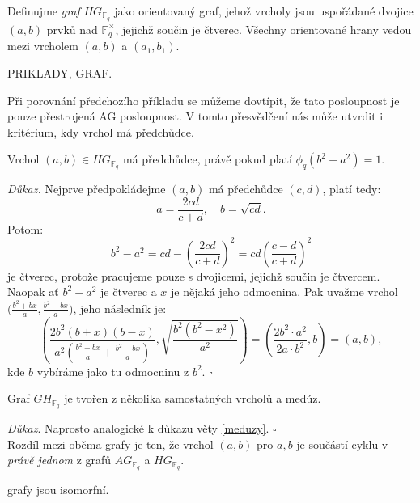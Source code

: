 \documentclass[12pt]{report}
\begin{document}
\begin{definice}
Definujme \textit{graf} $HG_{\mathbb{F}_q}$ jako orientovaný graf, jehož vrcholy jsou uspořádané dvojice $(a,b)$ prvků nad $\mathbb{F}_q ^{\times}$, jejichž součin je čtverec. Všechny orientované hrany vedou mezi vrcholem $(a,b)$ a $(a_1,b_1)$.
\end{definice}
PRIKLADY, GRAF.

Při porovnání předchozího příkladu se můžeme dovtípit, že tato posloupnost je pouze přestrojená AG posloupnost. V tomto přesvědčení nás může utvrdit i kritérium, kdy vrchol má předchůdce.


\begin{lemma}
Vrchol $(a,b) \in HG_{\mathbb{F}_q}$ má předchůdce, právě pokud platí $\phi_q(b^2-a^2)=1$.
\end{lemma}

\noindent \textit{Důkaz.} Nejprve předpokládejme $(a,b)$ má předchůdce $(c,d)$, platí tedy:
\begin{equation*}
a = \frac{2cd}{c+d}, \quad b = \sqrt{cd}.
\end{equation*}
Potom:
\begin{equation*}
b^2-a^2 = cd- \left(\frac{2 cd}{c+d} \right)^2 = cd \left( \frac{c-d}{c+d} \right)^2
\end{equation*}
je čtverec, protože pracujeme pouze s dvojicemi, jejichž součin je čtvercem. Naopak ať $b^2-a^2$ je čtverec a $x$ je nějaká jeho odmocnina. Pak uvažme vrchol $\Big(\frac{b^2+b  x}{a},\frac{b^2-bx}{a} \Big)$, jeho následník je: $$\left(\frac{2 b^2 (b+x)(b-x)}{a^2 \left(\frac{b^2+bx}{a} + \frac{b^2-bx}{a} \right)}, \sqrt{\frac{b^2(b^2-x^2)}{a^2}} \right)= \left(\frac{2 b^2 \cdot a^2}{2 a \cdot b^2 }, b \right) = \left(a, b \right),$$
kde $b$ vybíráme jako tu  odmocninu z $b^2$. \hfill $\square$

\begin{dusledek}
Graf $GH_{\mathbb{F}_q}$ je tvořen z několika samostatných vrcholů a medúz.
\end{dusledek}
\noindent \textit{Důkaz}. Naprosto analogické k důkazu věty \ref{meduzy}. \hfill $\square$\\

Rozdíl mezi oběma grafy je ten, že vrchol $(a,b)$ pro $a,b$ je součástí cyklu v \textit{právě jednom} z grafů $AG_{\mathbb{F}_q}$ a $HG_{\mathbb{F}_q}$.

\begin{veta}
grafy jsou isomorfní.
\end{veta}
\end{document}
